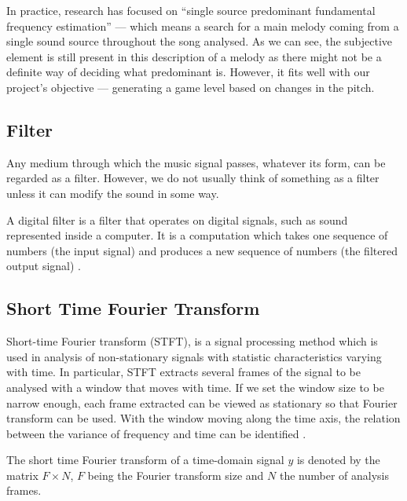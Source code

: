 In practice, research has focused on ``single source predominant fundamental frequency estimation'' — which means a search for a main melody coming from a single sound source throughout the song analysed. As we can see, the subjective element is still present in this description of a melody as there might not be a definite way of deciding what predominant is. However, it fits well with our project’s objective — generating a game level based on changes in the pitch.

\vspace{10pt}

\subsection{Filter}

Any medium through which the music signal passes, whatever its form, can be regarded as a filter. However, we do not usually think of something as a filter unless it can modify the sound in some way. 

A digital filter is a filter that operates on digital signals, such as sound represented inside a computer. It is a computation which takes one sequence of numbers (the input signal) and produces a new sequence of numbers (the filtered output signal) \cite{filters}.

\vspace{10pt}

\subsection{Short Time Fourier Transform}

Short-time Fourier transform (STFT), is a signal processing method which is used in analysis of non-stationary signals with statistic characteristics varying with time.
In particular, STFT extracts several frames of the signal to be analysed with a window that moves with time. If we set the window size to be narrow enough, each frame extracted can be viewed as stationary so that Fourier transform can be used. With the window moving along the time axis, the relation between the variance of frequency and time can be identified \cite{STFT}.

The short time Fourier transform of a time-domain signal $y$ is denoted by the matrix $F \times N$, $F$ being the Fourier transform size and $N$ the number of analysis frames.

\vspace{10pt}

